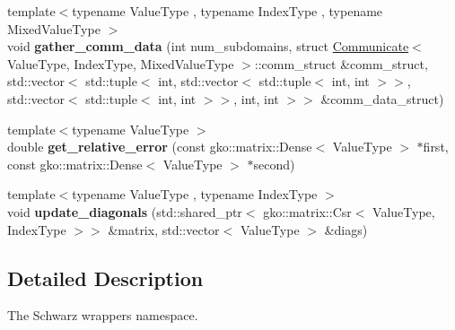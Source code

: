 \begin{DoxyCompactItemize}
{\footnotesize template$<$typename Value\+Type , typename Index\+Type , typename Mixed\+Value\+Type $>$ }\\void {\bfseries gather\+\_\+comm\+\_\+data} (int num\+\_\+subdomains, struct \hyperlink{classschwz_1_1Communicate}{Communicate}$<$ Value\+Type, Index\+Type, Mixed\+Value\+Type $>$\+::comm\+\_\+struct \&comm\+\_\+struct, std\+::vector$<$ std\+::tuple$<$ int, std\+::vector$<$ std\+::tuple$<$ int, int $>$$>$, std\+::vector$<$ std\+::tuple$<$ int, int $>$$>$, int, int $>$$>$ \&comm\+\_\+data\+\_\+struct)
\item 
\mbox{\label{namespaceschwz_a326d36155d6eeccd87f66fdf5200df29}} 
{\footnotesize template$<$typename Value\+Type $>$ }\\double {\bfseries get\+\_\+relative\+\_\+error} (const gko\+::matrix\+::\+Dense$<$ Value\+Type $>$ $\ast$first, const gko\+::matrix\+::\+Dense$<$ Value\+Type $>$ $\ast$second)
\item 
\mbox{\label{namespaceschwz_aac5839ef31d9d40a6a9c80a8611b6e50}} 
{\footnotesize template$<$typename Value\+Type , typename Index\+Type $>$ }\\void {\bfseries update\+\_\+diagonals} (std\+::shared\+\_\+ptr$<$ gko\+::matrix\+::\+Csr$<$ Value\+Type, Index\+Type $>$$>$ \&matrix, std\+::vector$<$ Value\+Type $>$ \&diags)
\end{DoxyCompactItemize}


\subsection{Detailed Description}
The Schwarz wrappers namespace. 